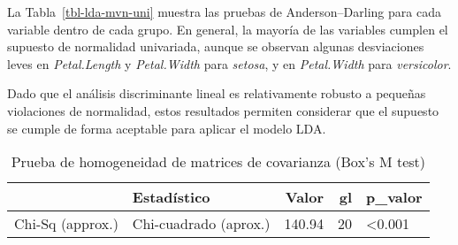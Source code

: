 \documentclass[
  spanish,
  11pt,
  a4paper,
  DIV=11,
  numbers=noendperiod]{scrartcl}
\newenvironment{Shaded}{\begin{snugshade}}{\end{snugshade}}
\newcommand{\AttributeTok}[1]{\textcolor[rgb]{0.40,0.45,0.13}{#1}}
\newcommand{\CommentTok}[1]{\textcolor[rgb]{0.37,0.37,0.37}{#1}}
\newcommand{\DecValTok}[1]{\textcolor[rgb]{0.68,0.00,0.00}{#1}}
\newcommand{\FunctionTok}[1]{\textcolor[rgb]{0.28,0.35,0.67}{#1}}
\newcommand{\NormalTok}[1]{\textcolor[rgb]{0.00,0.23,0.31}{#1}}
\newcommand{\OtherTok}[1]{\textcolor[rgb]{0.00,0.23,0.31}{#1}}
\newcommand{\SpecialCharTok}[1]{\textcolor[rgb]{0.37,0.37,0.37}{#1}}
\newcommand{\StringTok}[1]{\textcolor[rgb]{0.13,0.47,0.30}{#1}}
\begin{document}
La Tabla~\ref{tbl-lda-mvn-uni} muestra las pruebas de Anderson--Darling
para cada variable dentro de cada grupo. En general, la mayoría de las
variables cumplen el supuesto de normalidad univariada, aunque se
observan algunas desviaciones leves en \emph{Petal.Length} y
\emph{Petal.Width} para \emph{setosa}, y en \emph{Petal.Width} para
\emph{versicolor}.

Dado que el análisis discriminante lineal es relativamente robusto a
pequeñas violaciones de normalidad, estos resultados permiten considerar
que el supuesto se cumple de forma aceptable para aplicar el modelo LDA.

\begin{Shaded}
\end{Shaded}

\begin{longtable}[]{@{}llrrl@{}}

\caption{\label{tbl-lda-boxm}Prueba de homogeneidad de matrices de
covarianza (Box's M test)}

\tabularnewline

\toprule\noalign{}
& Estadístico & Valor & gl & p\_valor \\
\midrule\noalign{}
\endhead
\bottomrule\noalign{}
\endlastfoot
Chi-Sq (approx.) & Chi-cuadrado (aprox.) & 140.94 & 20 &
\textless0.001 \\

\end{longtable}
\end{document}
